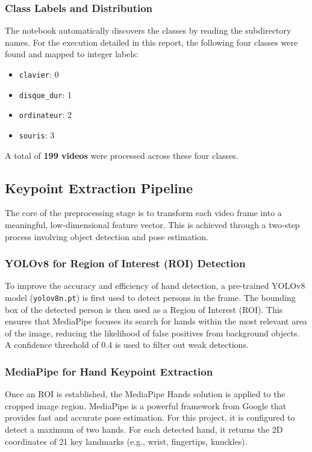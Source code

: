 \documentclass[11pt, a4paper]{article}
\begin{document}
\subsubsection{Class Labels and Distribution}
The notebook automatically discovers the classes by reading the subdirectory names. For the execution detailed in this report, the following four classes were found and mapped to integer labels:
\begin{itemize}
    \item \texttt{clavier}: 0
    \item \texttt{disque\_dur}: 1
    \item \texttt{ordinateur}: 2
    \item \texttt{souris}: 3
\end{itemize}
A total of \textbf{199 videos} were processed across these four classes.

\subsection{Keypoint Extraction Pipeline}
The core of the preprocessing stage is to transform each video frame into a meaningful, low-dimensional feature vector. This is achieved through a two-step process involving object detection and pose estimation.

\subsubsection{YOLOv8 for Region of Interest (ROI) Detection}
To improve the accuracy and efficiency of hand detection, a pre-trained YOLOv8 model (\texttt{yolov8n.pt}) is first used to detect persons in the frame. The bounding box of the detected person is then used as a Region of Interest (ROI). This ensures that MediaPipe focuses its search for hands within the most relevant area of the image, reducing the likelihood of false positives from background objects. A confidence threshold of 0.4 is used to filter out weak detections.

\subsubsection{MediaPipe for Hand Keypoint Extraction}
Once an ROI is established, the MediaPipe Hands solution is applied to the cropped image region. MediaPipe is a powerful framework from Google that provides fast and accurate pose estimation. For this project, it is configured to detect a maximum of two hands. For each detected hand, it returns the 2D coordinates of 21 key landmarks (e.g., wrist, fingertips, knuckles).
\end{document}
